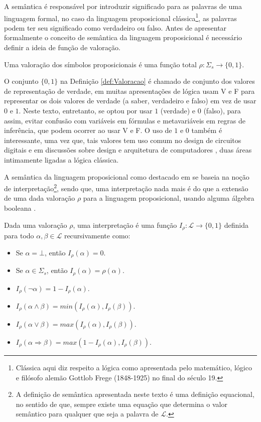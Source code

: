 A semântica é responsável por introduzir significado para as palavras de uma linguagem formal, no caso da linguagem proposicional clássica\footnote{Clássica aqui diz respeito a lógica como apresentada pelo  matemático, lógico e filósofo alemão Gottlob Frege (1848-1925) no final do século 19.}, as palavras podem ter seu significado como verdadeiro ou falso. Antes de apresentar formalmente o conceito de semântica da linguagem proposicional é necessário definir a ideia de função de  valoração.

\begin{definicao}[Valoração]\label{def:Valoracao}
  Uma valoração dos símbolos proposicionais é uma função total $\rho : \Sigma_s \rightarrow \{0,1\}$.
\end{definicao}

O conjunto $\{0,1\}$ na Definição \ref{def:Valoracao} é chamado de conjunto dos valores de representação de verdade, em muitas apresentações de lógica usam V e F para representar os dois valores de verdade (a saber, verdadeiro e falso) em vez de usar $0$ e $1$. Neste texto, entretanto, se optou por usar $1$ (verdade) e $0$ (falso), para assim, evitar confusão com variáveis em fórmulas e metavariáveis em regras de inferência, que podem ocorrer ao usar V e F. O uso de $1$ e $0$ também é interessante, uma vez que, tais valores tem uso comum no design de circuitos digitais \cite{capuano2018, holdsworth2002, lourencco1996} e em discussões sobre design e arquitetura de computadores \cite{murdocca2001, stallings2010}, duas áreas intimamente ligadas a lógica clássica.

A semântica da linguagem proposicional como destacado em \cite{joaoPavao2014} se baseia na noção de interpretação\footnote{A definição de semântica apresentada neste texto é uma definição equacional, no sentido de que, sempre existe uma equação que determina o valor semântico para qualquer que seja a palavra de $\mathcal{L}$.}, sendo que, uma interpretação nada mais é do que a extensão de uma dada valoração $\rho$ para a linguagem proposicional, usando alguma álgebra booleana \cite{boole1854, boole1957}.

\begin{definicao}[Interpretação]\label{def:interpretacao}
  Dada uma valoração $\rho$, uma interpretação é uma função $I_\rho : \mathcal{L} \rightarrow \{0,1\}$ definida para todo $\alpha, \beta \in \mathcal{L}$ recursivamente como:
  \begin{itemize}
       \item Se $\alpha = \bot$, então $I_\rho(\alpha) = 0$.
       \item Se $\alpha \in \Sigma_s$, então $I_\rho(\alpha) = \rho(\alpha)$.
       \item $I_\rho(\neg \alpha) = 1 - I_\rho(\alpha)$.
       \item $I_\rho(\alpha \land \beta) = min(I_\rho(\alpha), I_\rho(\beta))$.
       \item $I_\rho(\alpha \lor \beta) = max(I_\rho(\alpha), I_\rho(\beta))$.
       \item $I_\rho(\alpha \Rightarrow \beta) = max(1 - I_\rho(\alpha), I_\rho(\beta))$.
  \end{itemize}
\end{definicao}

